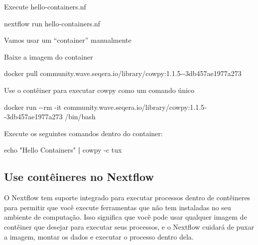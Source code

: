 \documentclass[
  brazilian,
  letterpaper,
  DIV=11,
  numbers=noendperiod]{scrreprt}
\newenvironment{Shaded}{\begin{snugshade}}{\end{snugshade}}
\newcommand{\AttributeTok}[1]{\textcolor[rgb]{0.40,0.45,0.13}{#1}}
\newcommand{\BuiltInTok}[1]{\textcolor[rgb]{0.00,0.23,0.31}{#1}}
\newcommand{\ExtensionTok}[1]{\textcolor[rgb]{0.00,0.23,0.31}{#1}}
\newcommand{\KeywordTok}[1]{\textcolor[rgb]{0.00,0.23,0.31}{\textbf{#1}}}
\newcommand{\NormalTok}[1]{\textcolor[rgb]{0.00,0.23,0.31}{#1}}
\newcommand{\StringTok}[1]{\textcolor[rgb]{0.13,0.47,0.30}{#1}}
\begin{document}
Execute hello-containers.nf

\begin{Shaded}
\begin{Highlighting}[]
\ExtensionTok{nextflow}\NormalTok{ run hello{-}containers.nf}
\end{Highlighting}
\end{Shaded}

Vamos usar um ``container'' manualmente

Baixe a imagem do container

\begin{Shaded}
\begin{Highlighting}[]
\ExtensionTok{docker}\NormalTok{ pull }\StringTok{\textquotesingle{}community.wave.seqera.io/library/cowpy:1.1.5{-}{-}3db457ae1977a273\textquotesingle{}}
\end{Highlighting}
\end{Shaded}

Use o contêiner para executar cowpy como um comando único

\begin{Shaded}
\begin{Highlighting}[]
\ExtensionTok{docker}\NormalTok{ run }\AttributeTok{{-}{-}rm} \AttributeTok{{-}it} \StringTok{\textquotesingle{}community.wave.seqera.io/library/cowpy:1.1.5{-}{-}3db457ae1977a273\textquotesingle{}}\NormalTok{ /bin/bash}
\end{Highlighting}
\end{Shaded}

Execute os seguintes comandos dentro do container:

\begin{Shaded}
\begin{Highlighting}[]
\BuiltInTok{echo} \StringTok{"Hello Containers"} \KeywordTok{|} \ExtensionTok{cowpy} \AttributeTok{{-}c}\NormalTok{ tux}
\end{Highlighting}
\end{Shaded}

\subsection{Use contêineres no
Nextflow}\label{use-contuxeaineres-no-nextflow}

O Nextflow tem suporte integrado para executar processos dentro de
contêineres para permitir que você execute ferramentas que não tem
instaladas no seu ambiente de computação. Isso significa que você pode
usar qualquer imagem de contêiner que desejar para executar seus
processos, e o Nextflow cuidará de puxar a imagem, montar os dados e
executar o processo dentro dela.
\end{document}
